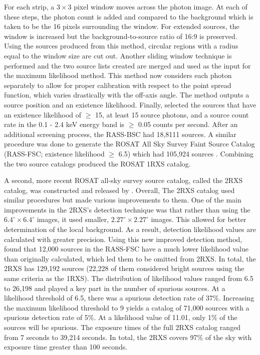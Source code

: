 For each strip, a $3 \times 3$ pixel window moves across the photon image. 
At each of these steps, the photon count is added and compared to the background which is taken to be the 16 pixels surrounding the window. 
For extended sources, the window is increased but the background-to-source ratio of 16:9 is preserved. 
Using the sources produced from this method, circular regions with a radius equal to the window size are cut out. 
Another sliding window technique is performed and the two source lists created are merged and used as the input for the maximum likelihood method.
This method now considers each photon separately to allow for proper calibration with respect to the point spread function, which varies drastically with the off-axis angle.
The method outputs a source position and an existence likelihood. 
Finally, \cite{voges1999} selected the sources that have an existence likelihood of $\geq$ 15, at least 15 source photons, and a source count rate in the 0.1 - 2.4 keV energy band is $\geq$ 0.05 counts per second. 
After an additional screening process, the RASS-BSC had 18,8111 sources.
A similar procedure was done to generate the ROSAT All Sky Survey Faint Source Catalog (RASS-FSC; existence likelihood $\geq$ 6.5) which had 105,924 sources \citep{voges2000}.
Combining the two source catalogs produced the ROSAT 1RXS catalog.

A second, more recent ROSAT all-sky survey source catalog, called the 2RXS catalog, was constructed and released by \cite{boller2016}. 
Overall, The 2RXS catalog used similar procedures but made various improvements to them.
One of the main improvements in the 2RXS’s detection technique was that rather than using the $6.4^{\circ} \times 6.4^{\circ}$ images, it used smaller, $2.27^{\circ} \times 2.27^{\circ}$ images. 
This allowed for better determination of the local background. 
As a result, detection likelihood values are calculated with greater precision. 
Using this new improved detection method, \cite{boller2016} found that 12,000 sources in the RASS-FSC have a much lower likelihood value than originally calculated, which led them to be omitted from 2RXS. 
In total, the 2RXS has 129,192 sources (22,228 of them considered bright sources using the same criteria as the 1RXS). 
The distribution of likelihood values ranged from 6.5 to 26,198 and played a key part in the number of spurious sources. 
At a likelihood threshold of 6.5, there was a spurious detection rate of 37\%. 
Increasing the maximum likelihood threshold to 9 yields a catalog of 71,000 sources with a spurious detection rate of 5\%.
At a likelihood value of 11.01, only 1\% of the sources will be spurious. 
The exposure times of the full 2RXS catalog ranged from 7 seconds to 39,214 seconds. 
In total, the 2RXS covers 97\% of the sky with exposure time greater than 100 seconds. 

